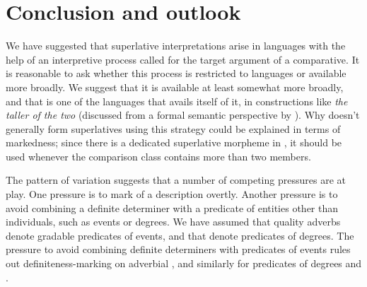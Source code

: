 \documentclass[output=paper
,modfonts
,nonflat]{langsci/langscibook}
\begin{document}
\section{Conclusion and outlook}

We have suggested that superlative interpretations arise in  languages with the help of an interpretive process called  for the target argument of a comparative. It is reasonable to ask whether this process is restricted to  languages or available more broadly. We suggest that it is available at least somewhat more broadly, and that  is one of the languages that avails itself of it, in constructions like \textit{the taller of the two} (discussed from a formal semantic perspective by \citealt{Szabolcsi2012}). Why  doesn't generally form superlatives using this strategy could be explained in terms of markedness; since there is a dedicated superlative morpheme in , it should be used whenever the comparison class contains more than two members.

The pattern of variation suggests that a number of competing pressures are at play. One pressure is to mark  of a description overtly. Another pressure is to avoid combining a definite determiner with a predicate of entities other than individuals, such as events or degrees. We have assumed that quality adverbs denote gradable predicates of events, and that  denote predicates of degrees. The pressure to avoid combining definite determiners with predicates of events rules out definiteness-marking on adverbial , and similarly for predicates of degrees and .
\end{document}
